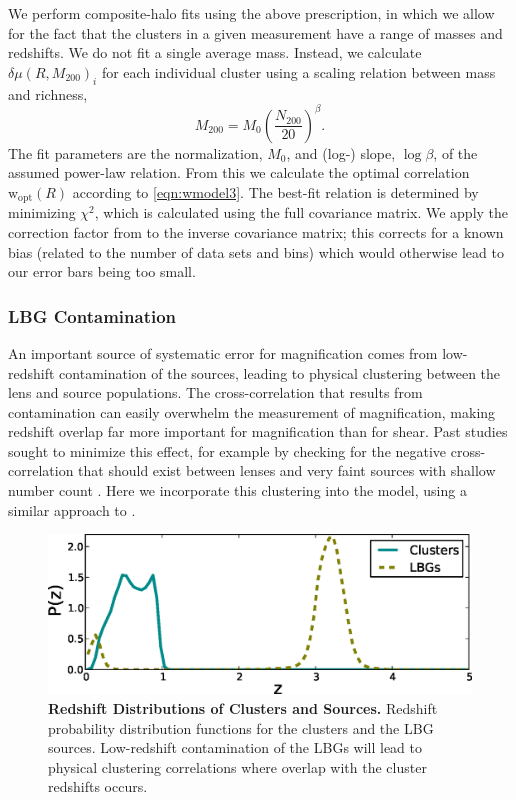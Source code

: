 We perform composite-halo fits using the above prescription, in which we allow for the fact that the clusters in a given measurement have a range of masses and redshifts. We do not fit a single average mass. Instead, we calculate $\delta\mu(R,M_{200})_i$ for each individual cluster using a scaling relation between mass and richness,
\begin{equation}
\label{eqn:mr3}
M_{200} = M_0 \left( \frac{N_{200}}{20} \right)^\beta.
\end{equation}
The fit parameters are the normalization, $M_0$, and (log-) slope, $\log\beta$, of the assumed power-law relation. From this we calculate the optimal correlation $\mathrm{w}_{\mathrm{opt}}(R)$ according to \autoref{eqn:wmodel3}. The best-fit relation is determined by minimizing $\chi^2$, which is calculated using the full covariance matrix. We apply the correction factor from \citet{Hartlap07} to the inverse covariance matrix; this corrects for a known bias (related to the number of data sets and bins) which would otherwise lead to our error bars being too small.


\subsubsection{\ac{LBG} Contamination}
\label{sec:contam3}
An important source of systematic error for magnification comes from low-redshift contamination of the sources, leading to physical clustering between the lens and source populations. The cross-correlation that results from contamination can easily overwhelm the measurement of magnification, making redshift overlap far more important for magnification than for shear. Past studies sought to minimize this effect, for example by checking for the negative cross-correlation that should exist between lenses and very faint sources with shallow number count \citep{Ford12, Hildebrandt09b}. Here we incorporate this clustering into the model, using a similar approach to \citet{Hildebrandt13}.

\begin{figure}
\begin{center}
\includegraphics[scale=0.7]{plots_ch3/PofZ_clustersNudrops.eps}
\caption[Redshift Distributions of Clusters and Sources]{{\bf Redshift Distributions of Clusters and Sources.} Redshift probability distribution functions for the clusters and the \ac{LBG} sources. Low-redshift contamination of the \ac{LBG}s will lead to physical clustering correlations where overlap with the cluster redshifts occurs.}
\label{plot:pofz3}
\end{center}
\end{figure}

